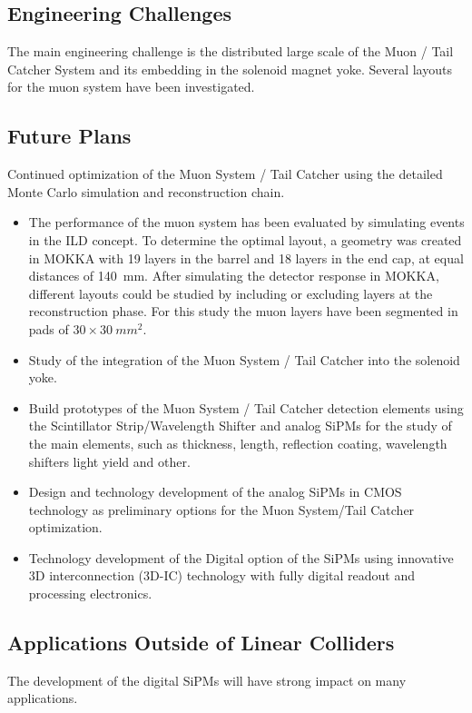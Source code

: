 \subsection{Engineering Challenges}
The main engineering challenge is the distributed large scale of the Muon / Tail Catcher System and its embedding in the solenoid magnet yoke.
Several layouts for the muon system have been investigated.

\subsection{Future Plans}
Continued optimization of the Muon System / Tail Catcher using the detailed Monte Carlo simulation and reconstruction chain.
\begin{itemize}
\item The performance of the muon system has been evaluated by simulating events in the ILD concept. To determine the optimal layout,
a geometry was created in MOKKA with 19 layers in the barrel and 18 layers in the end cap, at equal distances of \SI{140}{mm}. After simulating the detector response
in MOKKA, different layouts could be studied by including or excluding layers at the reconstruction phase. For this study the muon layers have been segmented in pads of $30\times\SI{30}{mm^2}$.
\item Study of the integration of the Muon System / Tail Catcher into the solenoid yoke.
\item Build prototypes of the Muon System / Tail Catcher detection elements using the Scintillator Strip/Wavelength Shifter and analog SiPMs for the study of the main elements, such as thickness, length, reflection coating, wavelength shifters light yield and other.
\item Design and technology development of the analog SiPMs in CMOS technology as preliminary options for the Muon System/Tail Catcher optimization.
\item Technology development of the Digital option of the SiPMs using innovative 3D interconnection (3D-IC) technology with fully digital readout and processing electronics.
\end{itemize}

\subsection{Applications Outside of Linear Colliders}

The development of the digital SiPMs will have strong impact on many applications.


